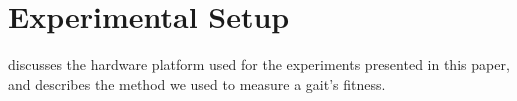 \section{Experimental Setup}

 discusses the hardware platform used for the
experiments presented in this paper, and 
describes the method we used to measure a gait's fitness.





